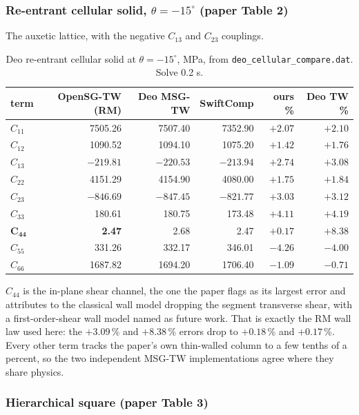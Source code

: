 \subsubsection{Re-entrant cellular solid, $\theta = -15^\circ$ (paper Table 2)}

The auxetic lattice, with the negative $C_{13}$ and $C_{23}$ couplings.

\begin{table}[htbp]
\centering
\small
\begin{tabular}{lrrrrr}
\toprule
term & OpenSG-TW (RM) & Deo MSG-TW & SwiftComp & ours \% & Deo TW \% \\
\midrule
$C_{11}$ & 7505.26 & 7507.40 & 7352.90 & $+2.07$ & $+2.10$ \\
$C_{12}$ & 1090.52 & 1094.10 & 1075.20 & $+1.42$ & $+1.76$ \\
$C_{13}$ & $-219.81$ & $-220.53$ & $-213.94$ & $+2.74$ & $+3.08$ \\
$C_{22}$ & 4151.29 & 4154.90 & 4080.00 & $+1.75$ & $+1.84$ \\
$C_{23}$ & $-846.69$ & $-847.45$ & $-821.77$ & $+3.03$ & $+3.12$ \\
$C_{33}$ &  180.61 &  180.75 &  173.48 & $+4.11$ & $+4.19$ \\
$\mathbf{C_{44}}$ & \textbf{2.47} & 2.68 & 2.47 & $\mathbf{+0.17}$ & $+8.38$ \\
$C_{55}$ &  331.26 &  332.17 &  346.01 & $-4.26$ & $-4.00$ \\
$C_{66}$ & 1687.82 & 1694.20 & 1706.40 & $-1.09$ & $-0.71$ \\
\bottomrule
\end{tabular}
\caption{Deo re-entrant cellular solid at $\theta = -15^\circ$, MPa, from
\texttt{deo\_cellular\_compare.dat}. Solve 0.2 s.}
\label{tab:deo-cell-m15}
\end{table}

$C_{44}$ is the in-plane shear channel, the one the paper flags as its largest
error and attributes to the classical wall model dropping the segment transverse
shear, with a first-order-shear wall model named as future work. That is exactly
the RM wall law used here: the $+3.09$\,\% and $+8.38$\,\% errors drop to
$+0.18$\,\% and $+0.17$\,\%. Every other term tracks the paper's own thin-walled
column to a few tenths of a percent, so the two independent MSG-TW
implementations agree where they share physics.

\subsubsection{Hierarchical square (paper Table 3)}

